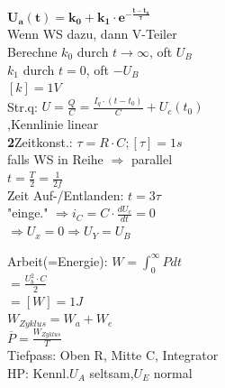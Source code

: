 \documentclass[11pt]{article}
\begin{document}
\begin{minipage}{0.33\textwidth}
$\mathbf{U_a(t) = k_0 + k_1 \cdot e^{-\frac{t-t_0}{\tau}}}$\\
Wenn WS dazu, dann V-Teiler\\
Berechne $k_0$ durch $t \rightarrow \infty$, oft $U_B$\\
$k_1$ durch $t = 0$, oft $-U_B$\\
$[k] = 1V$\\
Str.q: $U = \frac{Q}{C} = \frac{I_q \cdot (t-t_0)}{C} + U_c(t_0)$\\
\phantom{sss} ,Kennlinie linear\\
\textbf{2}Zeitkonst.: $\tau = R \cdot C;[\tau] = 1s$\\
\phantom{ss}falls WS in Reihe $\Rightarrow$ parallel\\
$t =\frac{T}{2} = \frac{1}{2f}$\\
Zeit Auf-/Entlanden: $t = 3\tau$\\

"einge." $\Rightarrow i_C = C \cdot \frac{dU_c}{dt} = 0$\\
\phantom{sss} $\Rightarrow U_x = 0 \Rightarrow U_Y = U_B$

Arbeit(=Energie): $W = \int_0^\infty P dt$\\
\phantom{sssssssss} $= \frac{U_b^2 \cdot C}{2} $\\
\phantom{sssssssss} $= [W] = 1J $\\
$W_{Zyklus} = W_a + W_e$\\
$\overline{P} = \frac{W_{Zyklus}}{T}$\\
Tiefpass: Oben R, Mitte C, Integrator\\
HP: Kennl.$U_A$ seltsam,$U_E$ normal
\end{minipage}%
~~~~~~~
\end{document}

